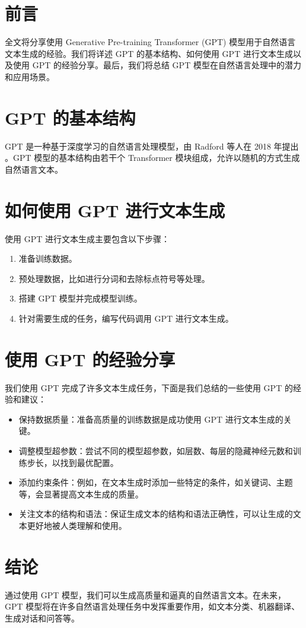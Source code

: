 




\setmainfont{Times New Roman} %



\date{\today}


  \section{前言}
  全文将分享使用 Generative Pre-training Transformer (GPT) 模型用于自然语言文本生成的经验。我们将详述 GPT 的基本结构、如何使用 GPT 进行文本生成以及使用 GPT 的经验分享。最后，我们将总结 GPT 模型在自然语言处理中的潜力和应用场景。

  \section{GPT 的基本结构}
  GPT 是一种基于深度学习的自然语言处理模型，由 Radford 等人在 2018 年提出 。GPT 模型的基本结构由若干个 Transformer 模块组成，允许以随机的方式生成自然语言文本。

  \section{如何使用 GPT 进行文本生成}
  使用 GPT 进行文本生成主要包含以下步骤：
  \begin{enumerate}
    \item 准备训练数据。
    \item 预处理数据，比如进行分词和去除标点符号等处理。
    \item 搭建 GPT 模型并完成模型训练。
    \item 针对需要生成的任务，编写代码调用 GPT 进行文本生成。
  \end{enumerate}

  \section{使用 GPT 的经验分享}
  我们使用 GPT 完成了许多文本生成任务，下面是我们总结的一些使用 GPT 的经验和建议：
  \begin{itemize}
    \item 保持数据质量：准备高质量的训练数据是成功使用 GPT 进行文本生成的关键。
    \item 调整模型超参数：尝试不同的模型超参数，如层数、每层的隐藏神经元数和训练步长，以找到最优配置。
    \item 添加约束条件：例如，在文本生成时添加一些特定的条件，如关键词、主题等，会显著提高文本生成的质量。
    \item 关注文本的结构和语法：保证生成文本的结构和语法正确性，可以让生成的文本更好地被人类理解和使用。
  \end{itemize}

  \section{结论}
  通过使用 GPT 模型，我们可以生成高质量和逼真的自然语言文本。在未来，GPT 模型将在许多自然语言处理任务中发挥重要作用，如文本分类、机器翻译、生成对话和问答等。

  \printbibliography[heading=bibintoc, title=参考文献] %
